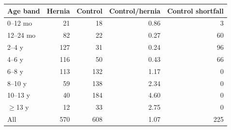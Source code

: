 \begin{tabular}{lrrrr}
\toprule
Age band & Hernia & Control & Control/hernia & Control shortfall \\
\midrule
0--12 mo & 21 & 18 & 0.86 & 3 \\
12--24 mo & 82 & 22 & 0.27 & 60 \\
2--4 y & 127 & 31 & 0.24 & 96 \\
4--6 y & 116 & 50 & 0.43 & 66 \\
6--8 y & 113 & 132 & 1.17 & 0 \\
8--10 y & 59 & 138 & 2.34 & 0 \\
10--13 y & 40 & 184 & 4.60 & 0 \\
$\ge$13 y & 12 & 33 & 2.75 & 0 \\
\midrule
All & 570 & 608 & 1.07 & 225 \\
\bottomrule
\end{tabular}
